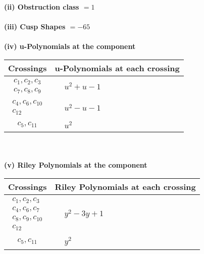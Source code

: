 \documentclass[1p]{elsarticle_modified}
\theoremstyle{definition}
\begin{document}
\flushleft \textbf{(ii) Obstruction class $= 1$}\\~\\
\flushleft \textbf{(iii) Cusp Shapes $= -65$}\\~\\
\newpage\renewcommand{\arraystretch}{1}
\flushleft \textbf{(iv) u-Polynomials at the component}\newline \\
\begin{tabular}{m{50pt}|m{274pt}}
Crossings & \hspace{64pt}u-Polynomials at each crossing \\
\hline $$\begin{aligned}c_{1},c_{2},c_{3}\\c_{7},c_{8},c_{9}\end{aligned}$$&$\begin{aligned}
&u^2+u-1
\end{aligned}$\\
\hline $$\begin{aligned}c_{4},c_{6},c_{10}\\c_{12}\end{aligned}$$&$\begin{aligned}
&u^2- u-1
\end{aligned}$\\
\hline $$\begin{aligned}c_{5},c_{11}\end{aligned}$$&$\begin{aligned}
&u^2
\end{aligned}$\\
\hline
\end{tabular}\\~\\
\newpage\renewcommand{\arraystretch}{1}
\flushleft \textbf{(v) Riley Polynomials at the component}\newline \\
\begin{tabular}{m{50pt}|m{274pt}}
Crossings & \hspace{64pt}Riley Polynomials at each crossing \\
\hline $$\begin{aligned}c_{1},c_{2},c_{3}\\c_{4},c_{6},c_{7}\\c_{8},c_{9},c_{10}\\c_{12}\end{aligned}$$&$\begin{aligned}
&y^2-3 y+1
\end{aligned}$\\
\hline $$\begin{aligned}c_{5},c_{11}\end{aligned}$$&$\begin{aligned}
&y^2
\end{aligned}$\\
\hline
\end{tabular}\\~\\
\end{document}
